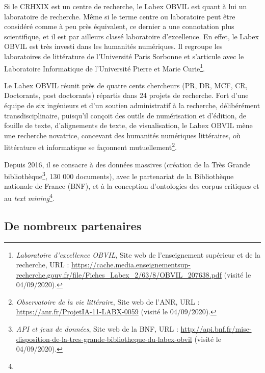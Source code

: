 Si le CRHXIX est un centre de recherche, le Labex OBVIL est quant à lui un laboratoire de recherche. Même si le terme centre ou laboratoire peut être considéré comme à peu près équivalent, ce dernier a une connotation plus scientifique, et il est par ailleurs classé laboratoire d'excellence. En effet, le Labex OBVIL est très investi dans les humanités numériques. Il regroupe les laboratoires de littérature de l'Université Paris Sorbonne et s'articule avec le Laboratoire Informatique de l'Université Pierre et Marie Curie\footnote{\emph{Laboratoire d'excellence OBVIL}, Site web de l'enseignement supérieur et de la recherche, URL : \url{https://cache.media.enseignementsup-recherche.gouv.fr/file/Fiches_Labex_2/63/8/OBVIL_207638.pdf} (visité le 04/09/2020).}.

Le Labex OBVIL réunit près de quatre cents chercheurs (PR, DR, MCF, CR, Doctorants, post doctorants) répartis dans 24 projets de recherche. Fort d'une équipe de six ingénieurs et d'un soutien administratif à la recherche, délibérément transdisciplinaire, puisqu'il conçoit des outils de numérisation et d'édition, de fouille de texte, d'alignements de texte, de visualisation, le Labex OBVIL mène une recherche novatrice, concevant des humanités numériques littéraires, où littérature et informatique se façonnent mutuellement\footnote{\emph{Observatoire de la vie littéraire}, Site web de l'ANR, URL : \url{https://anr.fr/ProjetIA-11-LABX-0059} (visité le 04/09/2020).}. 

Depuis 2016, il se consacre à des données massives (création de la Très Grande bibliothèque\footnote{\emph{API et jeux de données}, Site web de la BNF, URL : \url{http://api.bnf.fr/mise-disposition-de-la-tres-grande-bibliotheque-du-labex-obvil} (visité le 04/09/2020).}, 130 000 documents), avec le partenariat de la Bibliothèque nationale de France (BNF), et à la conception d'ontologies des corpus critiques et au \emph{text mining}\footnote{}.

\subsection{De nombreux partenaires}

